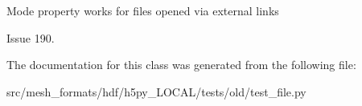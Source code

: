 \begin{DoxyVerb}Mode property works for files opened via external links

Issue 190.
\end{DoxyVerb}
 

The documentation for this class was generated from the following file\+:\begin{DoxyCompactItemize}
\item 
src/mesh\+\_\+formats/hdf/h5py\+\_\+\+L\+O\+C\+A\+L/tests/old/test\+\_\+file.\+py\end{DoxyCompactItemize}
